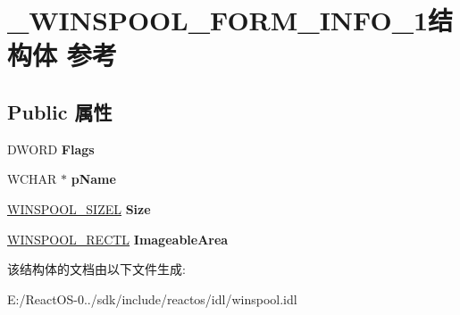 \hypertarget{struct___w_i_n_s_p_o_o_l___f_o_r_m___i_n_f_o__1}{}\section{\+\_\+\+W\+I\+N\+S\+P\+O\+O\+L\+\_\+\+F\+O\+R\+M\+\_\+\+I\+N\+F\+O\+\_\+1结构体 参考}
\label{struct___w_i_n_s_p_o_o_l___f_o_r_m___i_n_f_o__1}
\subsection*{Public 属性}
\begin{DoxyCompactItemize}
\item 
\mbox{\label{struct___w_i_n_s_p_o_o_l___f_o_r_m___i_n_f_o__1_a4d48bb312020e80a603d5fa2f029d800}} 
D\+W\+O\+RD {\bfseries Flags}
\item 
\mbox{\label{struct___w_i_n_s_p_o_o_l___f_o_r_m___i_n_f_o__1_aff5f28be8b2216fbfb066964ce23bd71}} 
W\+C\+H\+AR $\ast$ {\bfseries p\+Name}
\item 
\mbox{\label{struct___w_i_n_s_p_o_o_l___f_o_r_m___i_n_f_o__1_a0de8b3d4076d52246dbf7bf1023df02a}} 
\hyperlink{struct___w_i_n_s_p_o_o_l___s_i_z_e_l}{W\+I\+N\+S\+P\+O\+O\+L\+\_\+\+S\+I\+Z\+EL} {\bfseries Size}
\item 
\mbox{\label{struct___w_i_n_s_p_o_o_l___f_o_r_m___i_n_f_o__1_a986abac2c695a78a7ea64d29f9f97254}} 
\hyperlink{struct___w_i_n_s_p_o_o_l___r_e_c_t_l}{W\+I\+N\+S\+P\+O\+O\+L\+\_\+\+R\+E\+C\+TL} {\bfseries Imageable\+Area}
\end{DoxyCompactItemize}


该结构体的文档由以下文件生成\+:\begin{DoxyCompactItemize}
\item 
E\+:/\+React\+O\+S-\/0../sdk/include/reactos/idl/winspool.\+idl\end{DoxyCompactItemize}
